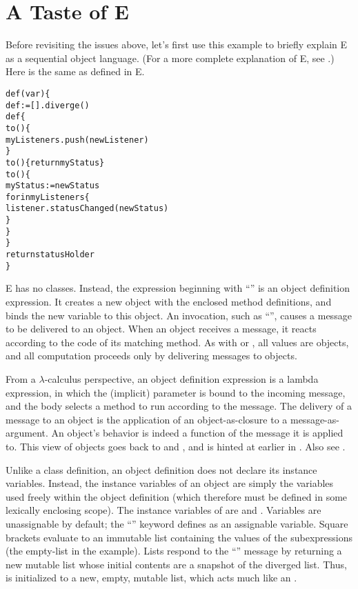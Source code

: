 \documentclass{llncs}
\begin{document}
\section{A Taste of E}

Before revisiting the issues above, let's first use this example to
briefly explain E as a sequential object language. (For a more
complete explanation of E, see \cite{stiegler:ewalnut}.)  Here is the
same  as defined in E.
%
\begin{alltt}
    def (var ) \{
        def  := [].diverge()
        def  \{
            to () \{
                myListeners.push(newListener)
            \}
            to () \{ return myStatus \}
            to () \{
                myStatus := newStatus
                for  in myListeners \{
                    listener.statusChanged(newStatus)
                \}
            \}
        \}
        return statusHolder
    \}
\end{alltt}
%
E has no classes. Instead, the expression beginning with ``'' is an object definition expression. It creates
a new object with the enclosed method definitions, and binds the new
 variable to this object. An invocation, such as
``'', causes a message to be
delivered to an object. When an object receives a message, it reacts
according to the code of its matching method. As with 
\cite{goldberg:purplebook} or  \cite{hewitt:actors}, all
values are objects, and all computation proceeds only by delivering
messages to objects.

From a $\lambda$-calculus perspective, an object definition expression
is a lambda expression, in which the (implicit) parameter is bound to
the incoming message, and the body selects a method to run according
to the message. The delivery of a message to an object is the
application of an object-as-closure to a message-as-argument. An
object's behavior is indeed a function of the message it is applied
to. This view of objects goes back to 
\cite{goldberg:smalltalk72} and , and is hinted at earlier
in \cite{hoare65}. Also see \cite{shroff:match}.

Unlike a class definition, an object definition does not declare its
instance variables. Instead, the instance variables of an object are
simply the variables used freely within the object definition (which
therefore must be defined in some lexically enclosing scope). The
instance variables of  are  and
.  Variables are unassignable by default; the
``'' keyword defines  as an assignable
variable. Square brackets evaluate to an immutable list containing the
values of the subexpressions (the empty-list in the example). Lists
respond to the ``'' message by returning a new mutable
list whose initial contents are a snapshot of the diverged list. Thus,
 is initialized to a new, empty, mutable list, which
acts much like an .
\end{document}
